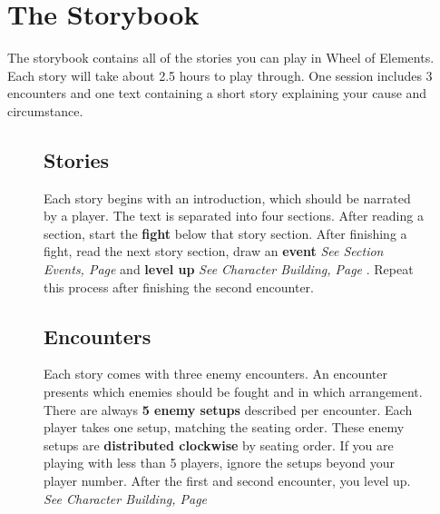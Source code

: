 
\section{The Storybook}
The storybook contains all of the stories you can play in Wheel of Elements.
Each story will take about 2.5 hours to play through. One session includes 3 encounters and one text containing a short story explaining your cause and circumstance.

\begin{figure}[ht]
	\begin{minipage}[t][9cm][t]{0.5\textwidth}
		\begin{minipage}[t][5cm][t]{0.9\textwidth}
		\end{minipage}
	\end{minipage}
	\begin{minipage}[t][9cm][t]{\textwidth}
		
		\subsection*{Stories}
		Each story begins with an introduction, which should be narrated by a player.
		The text is separated into four sections. After reading a section, start the \textbf{fight} below that story section. After finishing a fight, read the next story section, draw an \textbf{event}  \textit{See Section Events, Page \pageref{Section_Events}} and \textbf{level up} \textit{See Character Building, Page \pageref{Section_CharacterBuilding}}. Repeat this process after finishing the second encounter.
		
		
		\subsection*{Encounters}
		Each story comes with three enemy encounters. An encounter presents which enemies should be fought and in which arrangement.
		There are always \textbf{5 enemy setups} described per encounter. Each player takes one setup, matching the seating order.
		These enemy setups are \textbf{distributed clockwise} by seating order. %
		If you are playing with less than 5 players, ignore the setups beyond your player number.
		After the first and second encounter, you level up. \textit{See Character Building, Page \pageref{Section_CharacterBuilding}}
		
	\end{minipage}	
	
\end{figure}




